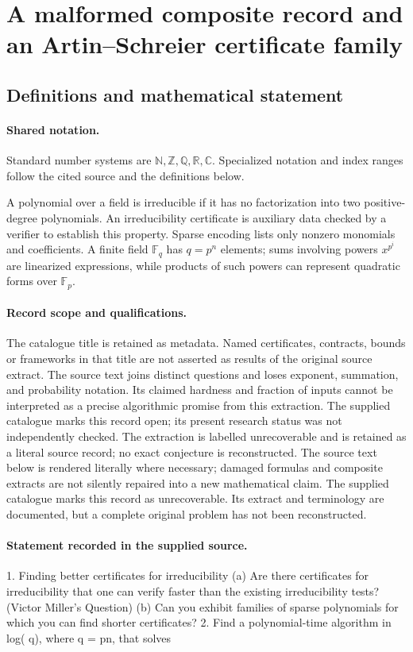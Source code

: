\documentclass[11pt]{article}
\begin{document}
\section{A malformed composite record and an Artin--Schreier certificate family}\label{statement}

\subsection{Definitions and mathematical statement}

\paragraph{Shared notation.}Standard number systems are $\mathbb N,\mathbb Z,\mathbb Q,\mathbb R,\mathbb C$. Specialized notation and index ranges follow the cited source and the definitions below.


A polynomial over a field is irreducible if it has no factorization into two positive-degree polynomials. An irreducibility certificate is auxiliary data checked by a verifier to establish this property. Sparse encoding lists only nonzero monomials and coefficients. A finite field $\mathbb F_q$ has $q=p^n$ elements; sums involving powers $x^{p^i}$ are linearized expressions, while products of such powers can represent quadratic forms over $\mathbb F_p$.
\paragraph{Record scope and qualifications.}
The catalogue title is retained as metadata. Named certificates, contracts, bounds or frameworks in that title are not asserted as results of the original source extract.
The source text joins distinct questions and loses exponent, summation, and probability notation. Its claimed hardness and fraction of inputs cannot be interpreted as a precise algorithmic promise from this extraction. The supplied catalogue marks this record open; its present research status was not independently checked. The extraction is labelled unrecoverable and is retained as a literal source record; no exact conjecture is reconstructed.
The source text below is rendered literally where necessary; damaged formulas and composite extracts are not silently repaired into a new mathematical claim.
The supplied catalogue marks this record as unrecoverable. Its extract and terminology are documented, but a complete original problem has not been reconstructed.
\paragraph{Statement recorded in the supplied source.}
1. Finding better certificates for irreducibility (a) Are there certificates for irreducibility that one can verify faster than the existing irreducibility tests? (Victor Miller's Question) (b) Can you exhibit families of sparse polynomials for which you can find shorter certificates? 2. Find a polynomial-time algorithm in log( q), where q = pn, that solves
\end{document}
